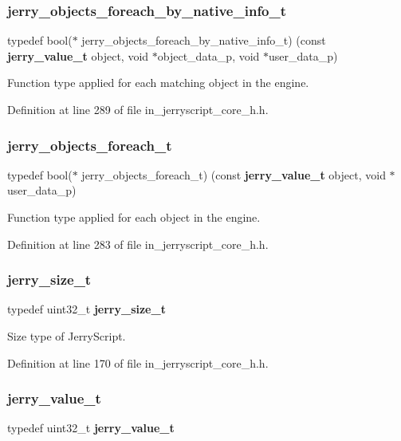 \subsubsection{jerry\_objects\_foreach\_by\_native\_info\_t}
{\footnotesize\ttfamily typedef bool($\ast$ jerry\+\_\+objects\+\_\+foreach\+\_\+by\+\_\+native\+\_\+info\+\_\+t) (const \textbf{ jerry\+\_\+value\+\_\+t} object, void $\ast$object\+\_\+data\+\_\+p, void $\ast$user\+\_\+data\+\_\+p)}

Function type applied for each matching object in the engine. 

Definition at line 289 of file in\+\_\+jerryscript\+\_\+core\+\_\+h.\+h.

\mbox{\label{group___core_ga8f3ea4d1cbbe836d26d03968d78b7235}} 
\subsubsection{jerry\_objects\_foreach\_t}
{\footnotesize\ttfamily typedef bool($\ast$ jerry\+\_\+objects\+\_\+foreach\+\_\+t) (const \textbf{ jerry\+\_\+value\+\_\+t} object, void $\ast$user\+\_\+data\+\_\+p)}

Function type applied for each object in the engine. 

Definition at line 283 of file in\+\_\+jerryscript\+\_\+core\+\_\+h.\+h.

\mbox{\label{group___core_ga794dc3132ec90171ffe27fb36d3df460}} 
\subsubsection{jerry\_size\_t}
{\footnotesize\ttfamily typedef uint32\+\_\+t \textbf{ jerry\+\_\+size\+\_\+t}}

Size type of Jerry\+Script. 

Definition at line 170 of file in\+\_\+jerryscript\+\_\+core\+\_\+h.\+h.

\mbox{\label{group___core_gaa03beec3b8d1cd4d04dab81b33053c60}} 
\subsubsection{jerry\_value\_t}
{\footnotesize\ttfamily typedef uint32\+\_\+t \textbf{ jerry\+\_\+value\+\_\+t}}

